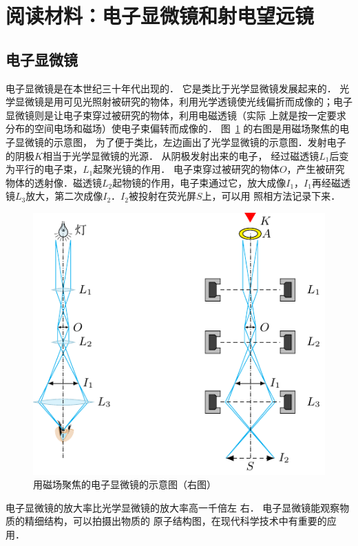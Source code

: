 \section*{阅读材料：电子显微镜和射电望远镜}
\subsection*{电子显微镜}


电子显微镜是在本世纪三十年代出现的．
它是类比于光学显微镜发展起来的．
光学显微镜是用可见光照射被研究的物体，利用光学透镜使光线偏折而成像的；电子
显微镜则是让电子束穿过被研究的物体，利用电磁透镜（实际
上就是按一定要求分布的空间电场和磁场）使电子束偏转而成像的．
图~\ref{fig_C_5-56} 的右图是用磁场聚焦的电子显微镜的示意图，
为了便于类比，左边画出了光学显微镜的示意图．发射电子
的阴极$K$相当于光学显微镜的光源．
从阴极发射出来的电子，
经过磁透镜$L_1$后变为平行的电子束，$L_1$起聚光镜的作用．
电子束穿过被研究的物体$O$，产生被研究物体的透射像．磁透镜$L_2$起物镜的作用，电子束通过它，放大成像$I_1$，$I_1$再经磁透镜$L_3$放大，第二次成像$I_2$．$I_2$被投射在荧光屏$S$上，可以用
照相方法记录下来．

\begin{figure}[htbp]
	\centering
	\includegraphics{fig/C/5-56.pdf}
	\caption{用磁场聚焦的电子显微镜的示意图（右图）}\label{fig_C_5-56}
\end{figure}


电子显微镜的放大率比光学显微镜的放大率高一千倍左
右．
电子显微镜能观察物质的精细结构，可以拍摄出物质的
原子结构图，在现代科学技术中有重要的应用．

